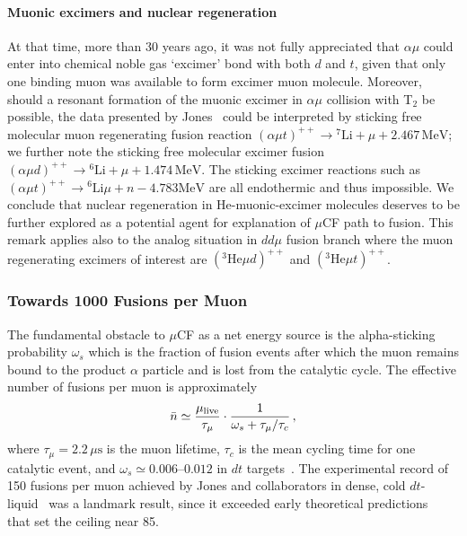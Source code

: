 \documentclass[particles,article,accept,pdftex,moreauthors]{Definitions/mdpi}
\begin{document}
\paragraph*{\bf Muonic excimers and nuclear regeneration}
At that time, more than 30 years ago, it was not fully appreciated that $\alpha\mu$ could enter into chemical noble gas `excimer' bond with both $d$ and $t$, given that only one binding muon was available to form excimer muon molecule. Moreover, should a resonant formation of the muonic excimer in $\alpha\mu$ collision with T$_2$ be possible, the data presented by Jones~\cite{jones1993evaluation,Jones1997} could be interpreted by sticking free molecular muon regenerating fusion reaction $(\alpha\mu t)^{++}\to{}^7\mathrm{Li}+\mu+2.467\,\mathrm{MeV}$; we further note the sticking free molecular excimer fusion $(\alpha\mu d)^{++}\to{}^6\mathrm{Li}+\mu+1.474\,\mathrm{MeV}$. The sticking excimer reactions such as $(\alpha\mu t)^{++} \to{}^6\mathrm{Li}\mu+n -4.783\mathrm{MeV}$ are all endothermic and thus impossible. We conclude that nuclear regeneration in He-muonic-excimer molecules deserves to be further explored as a potential agent for explanation of $\mu$CF path to fusion. This remark applies also to the analog situation in $dd\mu$ fusion branch where the muon regenerating excimers of interest are $({}^3\mathrm{He}\mu d)^{++}$ and $({}^3\mathrm{He}\mu t)^{++}$.

\subsubsection{Towards 1000 Fusions per Muon}\label{sssec:1000muCF}
The fundamental obstacle to $\mu$CF as a net energy source is the alpha-sticking probability $\omega_s$ which is the fraction of fusion events after which the muon remains bound to the product $\alpha$ particle and is lost from the catalytic cycle. The effective number of fusions per muon is approximately
\begin{equation}
\bar{n} \simeq \frac{\mu_{\rm live}}{\tau_\mu} \cdot \frac{1}{\omega_s + \tau_\mu/\tau_c}\,,
\end{equation}
where $\tau_\mu = 2.2\,\mu\mathrm{s}$ is the muon lifetime, $\tau_c$ is the mean cycling time for one catalytic event, and $\omega_s \simeq 0.006$--$0.012$ in $dt$ targets~\cite{jones1993evaluation}. The experimental record of 150 fusions per muon achieved by Jones and collaborators in dense, cold $dt$-liquid~\cite{Jones:1983pw,Jones:1986kk,Jones:1986Na} was a landmark result, since it exceeded early theoretical predictions~\cite{Jackson:2010Rem} that set the ceiling near 85.
\end{document}
